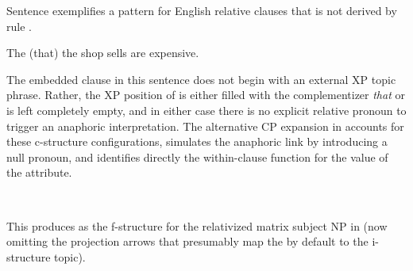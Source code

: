 \documentclass[output=paper,hidelinks]{langscibook}
\begin{document}

Sentence  exemplifies a pattern for English relative clauses that is not derived by rule .  

\ea \label{rel0a}
     The   (that)  the shop  sells  are expensive.
\z\bigskip

\noindent The embedded clause in this sentence does not begin with an external XP topic phrase.  Rather, the XP position of  is either filled with the complementizer \textit{that} or is left completely empty, and in either case there is no explicit relative pronoun to trigger an anaphoric interpretation.  The alternative CP expansion in  accounts for these c-structure configurations, simulates the anaphoric link by introducing a null pronoun, and identifies directly the within-clause function for the value of the  attribute.

\ea\label{nopro}
\\[1ex]
\z

\noindent This produces   as the f-structure for the relativized matrix subject NP in  (now omitting the projection arrows that presumably map the  by default to the i-structure topic).
\end{document}
